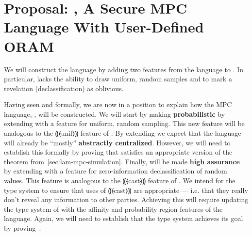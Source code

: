 \chapter{Proposal: \lang, A Secure MPC Language With User-Defined ORAM}
\label{ch:proposal}




We will construct the \lang language by adding two features from the \obliv language to \mpc. In particular, \mpc lacks
the ability to draw uniform, random samples and to mark a revelation (declassification) as oblivious.

Having seen \mpc and \obliv formally, we are now in a position to explain how the MPC language, \lang, will be constructed.
We will start by making \lang \textbf{probabilistic} by extending \mpc with a feature for uniform, random sampling. This new
feature will be analogous to the ⸨⦑unif⦒⸩ feature of \obliv. By extending \mpc we expect that the language will already be ``mostly''
\textbf{abstractly centralized}. However, we will need to establish this formally by proving that \lang satisfies an appropriate
version of the~ theorem from~\cref{sec:lam-mpc-simulation}. Finally, \lang will be made
\textbf{high assurance} by extending \lang with a feature for zero-information declassification of random values. This feature
is analogous to the ⸨⦑cast⦒⸩ feature of \obliv. We intend for the type system to ensure that uses of ⸨⦑cast⦒⸩ are appropriate
--- i.e. that they really don't reveal any information to other parties. Achieving this will require updating the type system
of \lang with the affinity and probability region features of the \obliv language. Again, we will need to establish that the
type system achieves its goal by proving~.

